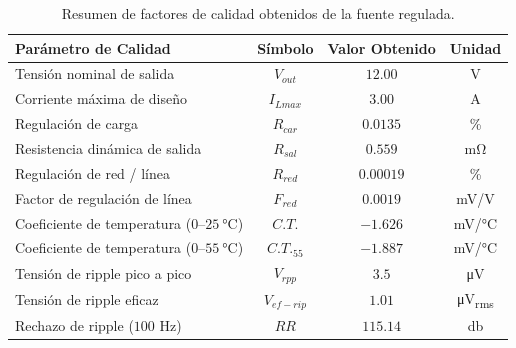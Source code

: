 \begin{table}[!ht]
\centering
\caption{Resumen de factores de calidad obtenidos de la fuente regulada.}
\label{tab.c5:calidad}
\begin{tabular}{lccc}
\hline
Parámetro de Calidad & Símbolo & Valor Obtenido & Unidad \\
\hline
Tensión nominal de salida & $V_{out}$ & $12.00$ & \si{\volt} \\
Corriente máxima de diseño & $I_{Lmax}$ & $3.00$ & \si{\ampere} \\
Regulación de carga & $R_{car}$ & $0.0135$ & \si{\percent} \\
Resistencia dinámica de salida & $R_{sal}$ & $0.559$ & \si{\milli\ohm} \\
Regulación de red / línea & $R_{red}$ & $0.00019$ & \si{\percent} \\
Factor de regulación de línea & $F_{red}$ & $0.0019$ & \si{\milli\volt/\volt} \\
Coeficiente de temperatura ($0\text{--}\SI{25}{\celsius}$) & $C.T.$ & $-1.626$ & \si{\milli\volt/\celsius} \\
Coeficiente de temperatura ($0\text{--}\SI{55}{\celsius}$) & $C.T._{55}$ & $-1.887$ & \si{\milli\volt/\celsius} \\
Tensión de ripple pico a pico & $V_{rpp}$ & $3.5$ & \si{\micro\volt} \\
Tensión de ripple eficaz & $V_{ef-rip}$ & $1.01$ & \si{\micro\volt_{rms}} \\
Rechazo de ripple ($100\text{ Hz}$) & $RR$ & $115.14$ & \si{\decibel} \\
\hline
\end{tabular}
\end{table}
